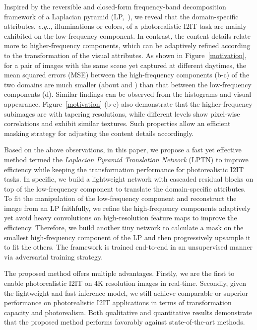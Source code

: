 \documentclass[10pt,twocolumn,letterpaper]{article}
\makeatletter
\DeclareRobustCommand\onedot{\futurelet\@let@token\@onedot}
\def\@onedot{\ifx\@let@token.\else.\null\fi\xspace}
\def\eg{\emph{e.g}\onedot} \def\Eg{\emph{E.g}\onedot}
\makeatother
\begin{document}
	Inspired by the reversible and closed-form frequency-band decomposition framework of a Laplacian pyramid (LP,~\cite{burt1983laplacian}), we reveal that the domain-specific attributes, \eg, illuminations or colors, of a photorealistic I2IT task are mainly exhibited on the low-frequency component. In contrast, the content details relate more to higher-frequency components, which can be adaptively refined according to the transformation of the visual attributes. As shown in Figure~\ref{motivation}, for a pair of images with the same scene yet captured at different daytimes, the mean squared errors (MSE) between the high-frequency components (b-c) of the two domains are much smaller (about  and ) than that between the low-frequency components (d). Similar findings can be observed from the histograms and visual appearance. Figure~\ref{motivation} (b-c) also demonstrate that the higher-frequency subimages are with tapering resolutions, while different levels show pixel-wise correlations and exhibit similar textures. Such properties allow an efficient masking strategy for adjusting the content details accordingly.
	
	Based on the above observations, in this paper, we propose a fast yet effective method termed the \textit{Laplacian Pyramid Translation Network} (LPTN) to improve efficiency while keeping the transformation performance for photorealistic I2IT tasks. In specific, we build a lightweight network with cascaded residual blocks on top of the low-frequency component to translate the domain-specific attributes. To fit the manipulation of the low-frequency component and reconstruct the image from an LP faithfully, we refine the high-frequency components adaptively yet avoid heavy convolutions on high-resolution feature maps to improve the efficiency. Therefore, we build another tiny network to calculate a mask on the smallest high-frequency component of the LP and then progressively upsample it to fit the others. The framework is trained end-to-end in an unsupervised manner via adversarial training strategy.
	
	The proposed method offers multiple advantages. Firstly, we are the first to enable photorealistic I2IT on 4K resolution images in real-time. Secondly, given the lightweight and fast inference model, we still achieve comparable or superior performance on photorealistic I2IT applications in terms of transformation capacity and photorealism. Both qualitative and quantitative results demonstrate that the proposed method performs favorably against state-of-the-art methods.
	
\end{document}
